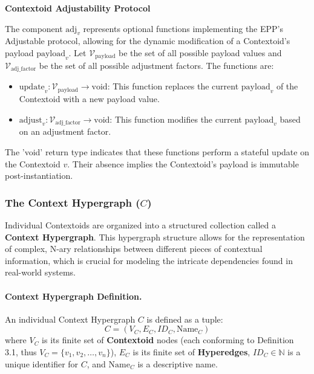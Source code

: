 \textbf{Contextoid Adjustability Protocol }
        
        The component \( \text{adj}_v \) represents optional functions implementing the EPP's Adjustable protocol, allowing for the dynamic modification of a Contextoid's payload \( \text{payload}_v \).
        Let \(\mathcal{V}_{\text{payload}}\) be the set of all possible payload values and \(\mathcal{V}_{\text{adj\_factor}}\) be the set of all possible adjustment factors. The functions are:
        \begin{itemize}
            \item \( \text{update}_v: \mathcal{V}_{\text{payload}} \to \text{void} \): This function replaces the current \( \text{payload}_v \) of the Contextoid with a new payload value.
            \item \( \text{adjust}_v: \mathcal{V}_{\text{adj\_factor}} \to \text{void} \): This function modifies the current \( \text{payload}_v \) based on an adjustment factor.
        \end{itemize}
        The 'void' return type indicates that these functions perform a stateful update on the Contextoid \(v\). Their absence implies the Contextoid's payload is immutable post-instantiation.

\subsubsection[The Context Hypergraph (C)]{The Context Hypergraph (\(C\))}
    \label{ssec:context_hypergraph_formal}

    Individual Contextoids are organized into a structured collection called a \textbf{Context Hypergraph}. This hypergraph structure allows for the representation of complex, N-ary relationships between different pieces of contextual information, which is crucial for modeling the intricate dependencies found in real-world systems.

    \paragraph*{Context Hypergraph Definition.} 
    An individual Context Hypergraph \( C \) is defined as a tuple:
    \[ C = (V_C, E_C, ID_C, \text{Name}_C) \]
    where \(V_C\) is its finite set of \textbf{Contextoid} nodes (each conforming to Definition 3.1, thus \( V_C = \{v_1, v_2, \dots, v_n\} \)), \(E_C\) is its finite set of \textbf{Hyperedges}, \(ID_C \in \mathbb{N}\) is a unique identifier for \(C\), and \(\text{Name}_C\) is a descriptive name.

